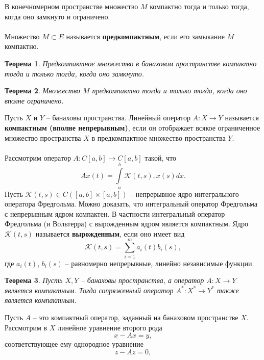 \documentclass[a4paper, 12pt]{report}
\numberwithin{equation}{section}
\newtheorem*{theorem}{Теорема}
\begin{document}
	\noindent
	В конечномерном пространстве множество $M$ компактно тогда и только тогда, когда оно замкнуто и ограничено.
	\\\\
	Множество $M \subset E$ называется \textbf{предкомпактным}, если его замыкание $\overline M$ компактно.
	\begin{theorem}
		Предкомпактное множество в банаховом пространстве компактно тогда и только тогда, когда оно замкнуто.
	\end{theorem}
	\begin{theorem}
		Множество $M$ предкомпактно тогда и только тогда, когда оно вполне ограничено.
	\end{theorem}
	\noindent
	Пусть $X$ и $Y$ -- банаховы пространства. Линейный оператор $A : X \to Y$ называется \textbf{компактным (вполне непрерывным)}, если он отображает всякое ограниченное множество пространства $X$  в предкомпактное множество пространства $Y$.
	\\\\
	Рассмотрим оператор $A : C[a,b]\to C[a,b]$ такой, что 
	\begin{equation*}
		Ax(t) = \int\limits_a^b \mathcal K(t,s), x(s)dx.
	\end{equation*}
	Пусть $\mathcal K(t,s) \in C([a,b]\times [a,b])$ -- непрерывное ядро интегрального оператора Фредгольма. Можно доказать, что интегральный оператор Фредгольма с непрерывным ядром компактен. В частности интегральный оператор Фредгольма (и Вольтерра) с вырожденным ядром является компактным. Ядро $\mathcal K(t,s)$ называется \textbf{вырожденным}, если оно имеет вид
	\begin{equation*}
		\mathcal K(t,s) = \sum_{i=1}^{m} a_i(t) b_i(s),
	\end{equation*}
	где $a_i(t)$, $b_i(s)$ -- равномерно непрерывные, линейно независимые функции.
	\begin{theorem}
		Пусть $X,Y$ -- банаховы пространства, а оператор $A:X\to Y$ является компактным. Тогда сопряженный оператор $A^* : X^* \to Y^*$ также является компактным.
	\end{theorem}
	\noindent
	Пусть $A$  -- это компактный оператор, заданный на банаховом пространстве $X$. Рассмотрим в $X$ линейное уравнение второго рода
	\begin{equation}
		\label{eq-II}
		x - Ax = y,
	\end{equation}
	соответствующее ему однородное уравнение 
	\begin{equation}
		\label{heq-II}
		z - Az = 0,
	\end{equation}
\end{document}
